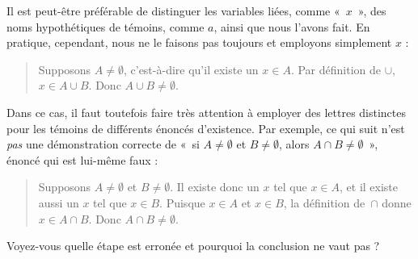\documentclass[../../../include/open-logic-section]{subfiles}
\begin{document}
Il est peut-être préférable de distinguer les
variables liées, comme «~$x$~», des noms
hypothétiques de témoins, comme $a$, ainsi
que nous l'avons fait. En pratique, cependant,
nous ne le faisons pas toujours et employons
simplement $x$ :
\begin{quote}
Supposons $A \neq \emptyset$, c'est-à-dire
qu'il existe un $x \in A$. Par définition
de $\cup$, $x \in A \cup B$. Donc
$A \cup B \neq \emptyset$.
\end{quote}
Dans ce cas, il faut toutefois faire très
attention à employer des lettres distinctes
pour les témoins de différents énoncés
d'existence. Par exemple, ce qui suit
n'est \emph{pas} une démonstration correcte
de «~si $A \neq \emptyset$ et
$B \neq \emptyset$, alors
$A \cap B \neq \emptyset$~»,
énoncé qui est lui-même faux :
\begin{quote}
Supposons $A \neq \emptyset$ et
$B \neq \emptyset$. Il existe donc
un $x$ tel que $x \in A$, et il
existe aussi un $x$ tel que $x \in B$.
Puisque $x \in A$ et $x \in B$,
la définition de~$\cap$ donne
$x \in A \cap B$. Donc
$A \cap B \neq \emptyset$.
\end{quote}
Voyez-vous quelle étape est erronée
et pourquoi la conclusion ne vaut pas ?
\end{document}
